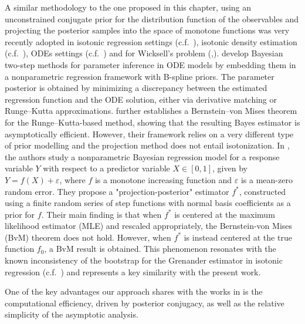 A similar methodology to the one proposed in this chapter,  using an unconstrained conjugate prior for the distribution function of the observables and projecting the posterior samples into the space of monotone functions was very recently adopted in isotonic regression settings (c.f.\ \cite{54,55,56}), isotonic density estimation (c.f.\ \cite{60}), ODEs settings (c.f.\ \cite{57,58}) and for Wicksell's problem (\cite{50},\cite{65}). \cite{57,58} develop Bayesian two-step methods for parameter inference in ODE models by embedding them in a nonparametric regression framework with B-spline priors. The parameter posterior is obtained by minimizing a discrepancy between the estimated regression function and the ODE solution, either via derivative matching or Runge--Kutta approximations. \cite{58} further establishes a Bernstein--von Mises theorem for the Runge--Kutta-based method, showing that the resulting Bayes estimator is asymptotically efficient. However, their framework relies on a very different type of prior modelling and the projection method does not entail isotonization. In \cite{54}, the authors study a nonparametric Bayesian regression model for a response variable \( Y \) with respect to a predictor variable \( X \in [0,1] \), given by \( Y = f(X) + \varepsilon \), where \( f \) is a monotone increasing function and \( \varepsilon \) is a mean-zero random error. They propose a "projection-posterior" estimator \( f^* \), constructed using a finite random series of step functions with normal basis coefficients as a prior for \( f \). Their main finding is that when \( f^* \) is centered at the maximum likelihood estimator (MLE) and rescaled appropriately, the Bernstein-von Mises (BvM) theorem does not hold. However, when \( f^* \) is instead centered at the true function \( f_0 \), a BvM result is obtained. This phenomenon resonates with the known inconsistency of the bootstrap for the Grenander estimator in isotonic regression (c.f.\ \cite{63}) and represents a key similarity with the present work.

One of the key advantages our approach shares with the works in \cite{57,58,54,55,56} is the computational efficiency, driven by posterior conjugacy, as well as the relative simplicity of the asymptotic analysis.



